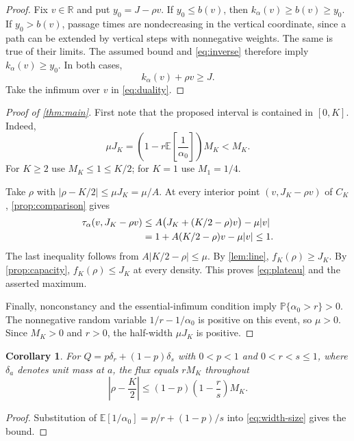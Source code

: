 \documentclass[11pt]{amsart}
\newtheorem{corollary}[theorem]{Corollary}
\theoremstyle{remark}
\newcommand{\EE}{\mathbb E}
\newcommand{\PP}{\mathbb P}
\newcommand{\RR}{\mathbb R}
\numberwithin{equation}{section}
\begin{document}
\begin{proof}
Fix $v\in\RR$ and put $y_0=J-\rho v$. If $y_0\leq b(v)$, then
$k_\alpha(v)\geq b(v)\geq y_0$. If $y_0>b(v)$, passage times are
nondecreasing in the vertical coordinate, since a path can be extended
by vertical steps with nonnegative weights. The same is true of their
limits. The assumed bound and \eqref{eq:inverse} therefore imply
$k_\alpha(v)\geq y_0$. In both cases,
\[
 k_\alpha(v)+\rho v\geq J.
\]
Take the infimum over $v$ in \eqref{eq:duality}.
\end{proof}

\begin{proof}[Proof of \cref{thm:main}]
First note that the proposed interval is contained in $[0,K]$.
Indeed,
\begin{equation}\label{eq:width-size}
 \mu J_K=\left(1-r\EE\!\left[\frac1{\alpha_0}\right]\right)M_K
             <M_K.
\end{equation}
For $K\geq2$ use $M_K\leq1\leq K/2$; for $K=1$ use $M_1=1/4$.

Take $\rho$ with $|\rho-K/2|\leq\mu J_K=\mu/A$. At every interior
point $(v,J_K-\rho v)$ of $C_K$, \cref{prop:comparison} gives
\begin{align}
 \tau_\alpha(v,J_K-\rho v)
 &\leq A\bigl(J_K+(K/2-\rho)v\bigr)-\mu|v|\notag\\
 &=1+A(K/2-\rho)v-\mu|v|\leq1.\label{eq:line-bound}
\end{align}
The last inequality follows from $A|K/2-\rho|\leq\mu$.
By \cref{lem:line}, $f_K(\rho)\geq J_K$. By
\cref{prop:capacity}, $f_K(\rho)\leq J_K$ at every density. This
proves \eqref{eq:plateau} and the asserted maximum.

Finally, nonconstancy and the essential-infimum condition imply
$\PP\{\alpha_0>r\}>0$. The nonnegative random variable
$1/r-1/\alpha_0$ is positive on this event, so $\mu>0$.
Since $M_K>0$ and $r>0$, the half-width $\mu J_K$ is positive.
\end{proof}

\begin{corollary}\label{cor:binary}
For $Q=p\delta_r+(1-p)\delta_s$ with $0<p<1$ and
$0<r<s\leq1$, where $\delta_a$ denotes unit mass at $a$, the flux
equals $rM_K$ throughout
\[
 \left|\rho-\frac K2\right|
 \leq (1-p)\left(1-\frac rs\right)M_K.
\]
\end{corollary}

\begin{proof}
Substitution of $\EE[1/\alpha_0]=p/r+(1-p)/s$ into
\eqref{eq:width-size} gives the bound.
\end{proof}
\end{document}

